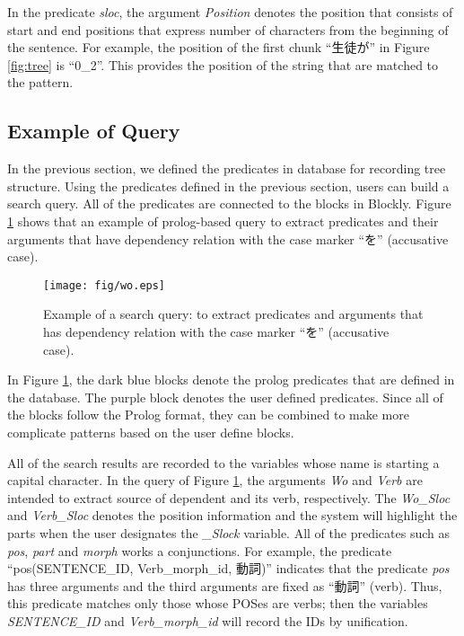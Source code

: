 \documentclass[conference]{IEEEtran}
\begin{document}
In the predicate {\it sloc}, the argument {\it Position} denotes
the position that consists of start and end positions that express number of characters
from the beginning of the sentence.
For example, the position of the first chunk ``生徒が'' in Figure \ref{fig:tree}
is ``0\_2''. This provides the position of the string that are matched to the pattern.



\subsection{Example of Query}
\label{sec:example}
In the previous section, we defined the predicates in database for recording tree structure.
Using the predicates defined in the previous section, 
users can build a search query. All of the predicates are connected to the blocks
in Blockly. Figure \ref{fig:pattern} shows that an example of prolog-based query to extract predicates and their arguments that have dependency relation with the case marker ``を'' (accusative case).

\begin{figure}[htbp]
\centerline{\texttt{[image: fig/wo.eps]}}
\caption{Example of a search query: to extract predicates and arguments that has dependency relation with the case marker ``を'' (accusative case).}
\label{fig:pattern}
\end{figure}

In Figure \ref{fig:pattern}, the dark blue blocks denote the prolog predicates that are defined
in the database. The purple block denotes the user defined predicates. Since all of the blocks
follow the Prolog format, they can be combined to make more complicate patterns based on the user define blocks.

All of the search results are recorded to the variables whose name is starting a capital character.
In the query of Figure \ref{fig:pattern}, the arguments {\it Wo} and {\it Verb} are intended
to extract source of dependent and its verb, respectively.
The {\it Wo\_Sloc} and {\it Verb\_Sloc} denotes the position information and the system
will highlight the parts when the user designates the {\it \_Slock} variable. 
All of the predicates such as {\it pos}, {\it part} and {\it morph} works a conjunctions.
For example, the predicate ``pos(SENTENCE\_ID, Verb\_morph\_id, 動詞)'' indicates that
the predicate {\it pos} has three arguments and the third arguments are fixed as ``動詞'' (verb).
Thus, this predicate matches only those whose POSes are verbs; then the variables
{\it SENTENCE\_ID} and {\it Verb\_morph\_id} will record the IDs by unification. 
\end{document}
